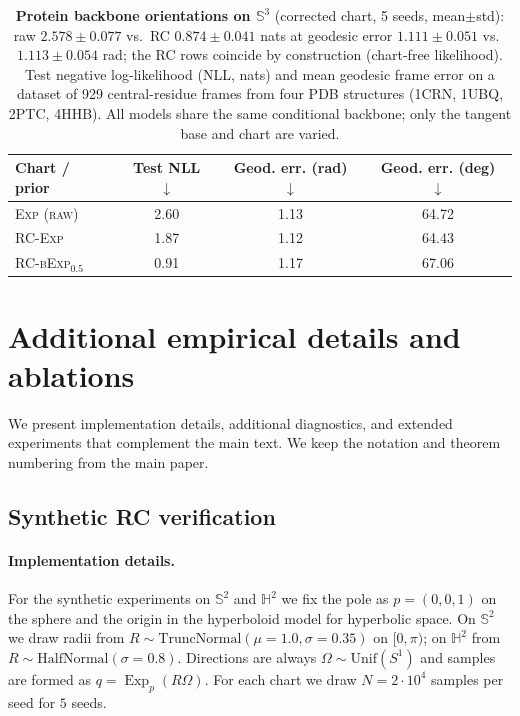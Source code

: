 \documentclass{article}
\theoremstyle{definition}
\theoremstyle{remark}
\newcommand{\SSS}{\mathbb{S}}
\newcommand{\HH}{\mathbb{H}}
\newcommand{\Exp}{\operatorname{Exp}}
\begin{document}
\begin{table}[H]
  \centering
  \caption{\textbf{Protein backbone orientations on $\SSS^3$} (corrected chart, 5 seeds, mean$\pm$std): raw $2.578\pm0.077$ vs.\ RC $0.874\pm0.041$ nats at geodesic error $1.111\pm0.051$ vs.\ $1.113\pm0.054$ rad; the RC rows coincide by construction (chart-free likelihood).
  Test negative log-likelihood (NLL, nats) and mean geodesic frame error on a
  dataset of 929 central-residue frames from four PDB structures
  (1CRN, 1UBQ, 2PTC, 4HHB). All models share the same conditional backbone;
  only the tangent base and chart are varied.}
  \label{tab:protein_rc}
  \vspace{0.3em}
  \begin{tabular}{lccc}
    \toprule
    Chart / prior & Test NLL $\downarrow$ & Geod. err. (rad) $\downarrow$ & Geod. err. (deg) $\downarrow$ \\
    \midrule
    \textsc{Exp (raw)}         & 2.60 & 1.13 & 64.72 \\
    \textsc{RC-Exp}           & 1.87 & 1.12 & 64.43 \\
    \textsc{RC-bExp}$_{0.5}$  & 0.91 & 1.17 & 67.06 \\
    \bottomrule
  \end{tabular}
\end{table}




\section*{Additional empirical details and ablations}
\label{app:experiments}

We present implementation details, additional diagnostics, and extended experiments
that complement the main text. We keep the notation and theorem numbering from the main
paper.

\subsection*{Synthetic RC verification}
\label{app:E1_details}

\paragraph{Implementation details.}
For the synthetic experiments on $\SSS^2$ and $\HH^2$ we fix the pole as
$p = (0,0,1)$ on the sphere and the origin in the hyperboloid model for hyperbolic space.
On $\SSS^2$ we draw radii from
$R \sim \mathrm{TruncNormal}(\mu{=}1.0,\sigma{=}0.35)$ on $[0,\pi)$; on $\HH^2$ from
$R \sim \mathrm{HalfNormal}(\sigma{=}0.8)$.
Directions are always $\Omega \sim \mathrm{Unif}(S^1)$ and samples are formed as
$q = \Exp_p(R \Omega)$.
For each chart we draw $N = 2 \cdot 10^4$ samples per seed for $5$ seeds.\\
\end{document}
